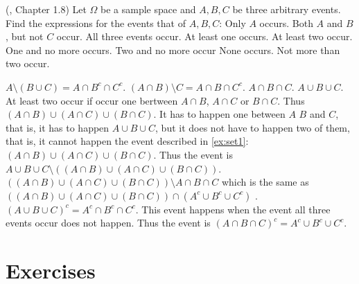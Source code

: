 \documentclass[12pt]{article}
\newcommand{\<}{{\langle \!\! \langle}}
\renewcommand{\>}{{\rangle \!\! \rangle}}
\begin{document}


\begin{ExerciseList}
	\Exercise (\cite{Feller}, Chapter 1.8) Let $\Omega$ be a sample space and $A,B, C$ be three arbitrary events. Find the expressions for the events that of $A,B,C$:
        \Question Only $A$ occurs.
	\Question  Both $A$ and $B$, but not $C$ occur. 
	\Question  All three events occur. 
	\Question  At least one occurs.
	\Question  At least two occur. 
	\Question  One and no more occurs.
	\Question  Two and no more occur 
	\Question  None occurs. 
	\Question  Not more than two occur.
	
	\Answer

	\Question	$A\setminus (B\cup C)=A\cap B^c \cap C^c$.
	\Question	$ (A\cap B)\setminus C = A\cap B \cap C^c$.
	\Question	$ A\cap B \cap C$.
	\Question	$ A\cup B \cup C$.
	\Question	\label{ex:set1} At least two occur if occur one bertween $A\cap B$, $A\cap C$ or $B\cap C$. Thus $ (A \cap B)\cup (A\cap C) \cup ( B \cap C)$. 
        \Question        It has to happen one between $A$ $B$ and $C$, that is, it has to happen $A\cup B \cup C$, but it does not have to happen two of them, that is, it cannot happen the event described in \ref{ex:set1}: 
	\Question	  $ (A \cap B)\cup (A\cap C) \cup ( B \cap C)$. Thus the event is $A\cup B \cup C \setminus ((A \cap B)\cup (A\cap C) \cup ( B \cap C))$.
	\Question	$ \left((A \cap B) \cup (A \cap C) \cup (B \cap C) \right)\setminus A \cap B \cap C $ which is the same as  $ \left((A \cap B) \cup (A \cap C) \cup (B \cap C) \right) \cap (A^c \cup B^c \cup  C^c) $ .
	\Question	$(A\cup B \cup C)^c= A^c\cap B^c \cap C^c$. 
	\Question	This event happens when the event all three events occur does not happen. Thus the event is $(A \cap B \cap C)^c =A^c \cup B^c \cup C^c. $

\end{ExerciseList}

\section{Exercises}
\end{document}
